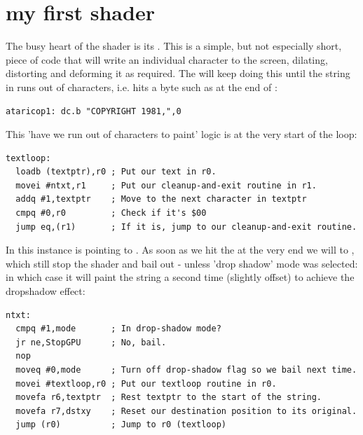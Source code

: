 \chapter{my first shader}
\lhead[tempest 2000]{}
\label{sec:listing}
\lstset{style=68KStyle}

The busy heart of the  shader is its . This is a simple, but not especially short, piece of code that
will write an individual character to the screen, dilating, distorting and deforming it as required. The  will
keep doing this until the string in  runs out of characters, i.e. hits a  byte such as at the end of
:

\begin{lstlisting}
ataricop1: dc.b "COPYRIGHT 1981,",0
\end{lstlisting}

This 'have we run out of characters to paint' logic is at the very start of the loop:

\begin{lstlisting}
textloop:
  loadb (textptr),r0 ; Put our text in r0.
  movei #ntxt,r1     ; Put our cleanup-and-exit routine in r1.
  addq #1,textptr    ; Move to the next character in textptr
  cmpq #0,r0         ; Check if it's $00
  jump eq,(r1)       ; If it is, jump to our cleanup-and-exit routine.
\end{lstlisting}

In this instance  is pointing to . As soon as we hit the  at the very end we will
 to , which still stop the shader and bail out - unless 'drop shadow' mode was selected: in which
case it will paint the string a second time (slightly offset) to achieve the dropshadow effect:

\begin{lstlisting}[caption=In fact there is no offset for drop-shadow mode implemented\, so the feature is unused.  I suspect this is because the code is copy-pasted from elsewhere\,
as we shall encounter a cousin of this routine later on.]
ntxt:
  cmpq #1,mode       ; In drop-shadow mode?
  jr ne,StopGPU      ; No, bail.
  nop
  moveq #0,mode      ; Turn off drop-shadow flag so we bail next time.
  movei #textloop,r0 ; Put our textloop routine in r0.
  movefa r6,textptr  ; Rest textptr to the start of the string.
  movefa r7,dstxy    ; Reset our destination position to its original.
  jump (r0)          ; Jump to r0 (textloop)
\end{lstlisting}

